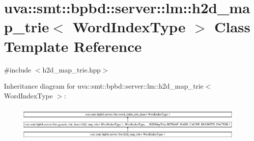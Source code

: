 \hypertarget{classuva_1_1smt_1_1bpbd_1_1server_1_1lm_1_1h2d__map__trie}{}\section{uva\+:\+:smt\+:\+:bpbd\+:\+:server\+:\+:lm\+:\+:h2d\+\_\+map\+\_\+trie$<$ Word\+Index\+Type $>$ Class Template Reference}
\label{classuva_1_1smt_1_1bpbd_1_1server_1_1lm_1_1h2d__map__trie}


{\ttfamily \#include $<$h2d\+\_\+map\+\_\+trie.\+hpp$>$}

Inheritance diagram for uva\+:\+:smt\+:\+:bpbd\+:\+:server\+:\+:lm\+:\+:h2d\+\_\+map\+\_\+trie$<$ Word\+Index\+Type $>$\+:\begin{figure}[H]
\begin{center}
\leavevmode
\includegraphics[height=1.791045cm]{classuva_1_1smt_1_1bpbd_1_1server_1_1lm_1_1h2d__map__trie}
\end{center}
\end{figure}
